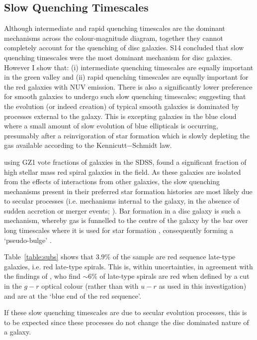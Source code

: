 \subsection{Slow Quenching Timescales}\label{slow}
Although intermediate and rapid quenching timescales are the dominant mechanisms across the colour-magnitude diagram, together they cannot completely account for the quenching of disc galaxies. S14 concluded that slow quenching timescales were the most dominant mechanism for disc galaxies. However I show that: (i) intermediate quenching timescales are equally important in the green valley and (ii) rapid quenching timescales are equally important for the red galaxies with NUV emission. There is also a significantly lower preference for smooth galaxies to undergo such slow quenching timescales; suggesting that the evolution (or indeed creation) of typical smooth galaxies is dominated by processes external to the galaxy. This is excepting galaxies in the blue cloud where a small amount of slow evolution of blue ellipticals is occurring, presumably after a reinvigoration of star formation which is slowly depleting the gas available according to the Kennicutt$-$Schmidt law.

\citet{Bamford09} using GZ1 vote fractions of galaxies in the SDSS, found a significant fraction of high stellar mass red spiral galaxies in the field. As these galaxies are isolated from the effects of interactions from other galaxies, the slow quenching mechanisms present in their preferred star formation histories are most likely due to secular processes (i.e. mechanisms internal to the galaxy, in the absence of sudden accretion or merger events; \citealt{kormendy04, Sheth12}). Bar formation in a disc galaxy is such a mechanism, whereby gas is funnelled to the centre of the galaxy by the bar over long timescales where it is used for star formation \citep{masters12a, saintonge12, Cheung13}, consequently forming a `pseudo-bulge' \citep{Kormendy10, Simmons13}.

Table~\ref{table:subs} shows that $3.9\%$ of the sample are red sequence late-type galaxies, i.e. red late-type spirals. This is, within uncertainties, in agreement with the findings of \citet{masters10c}, who find $\sim6\%$ of late-type spirals are red when defined by a cut in the $g-r$ optical colour (rather than with $u-r$ as used in this investigation) and are at the `blue end of the red sequence'. 

If these slow quenching timescales are due to secular evolution processes, this is to be expected since these processes do not change the disc dominated nature of a galaxy. 

